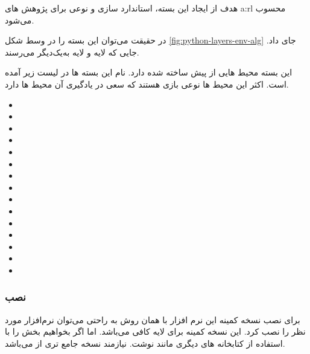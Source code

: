  هدف از ایجاد این بسته، استاندارد سازی 
و نوعی 
برای پژوهش های 
\gls*{a:rl}
محسوب می‌شود.\cite{medgyminstall}

در حقیقت می‌توان این بسته را در وسط شکل
\ref{fig:python-layers-env-alg}
جای‌ داد. جایی که لایه 
و لایه 
به‌یک‌دیگر می‌رسند. 

 این بسته محیط هایی از پیش ساخته شده دارد. نام این بسته ها در لیست زیر
 آمده است. 
 اکثر این محیط ها نوعی بازی هستند که 
 سعی در یادگیری آن محیط ها دارد.

 
\begin{multicols}{2}\scriptsize{}
\begin{itemize}
\item {}
\item {}
\item {}
\item {}
\item {}
\item {}
\item {}
\item {}
\item {}
\item {}
\item {}
\item {}
\item {}
\item {}
\item {}
\end{itemize}
\end{multicols}



\subsubsection{نصب}
 برای نصب نسخه کمینه این نرم افزار با همان روش  به راحتی می‌توان نرم‌افزار مورد نظر را نصب کرد.
 \cite{git/gym}
 این نسخه کمینه برای لایه 
 کافی می‌باشد. اما اگر بخواهیم بخش  را با استفاده از کتابخانه های دیگری مانند  نوشت. نیازمند نسخه جامع تری از  می‌باشد.


